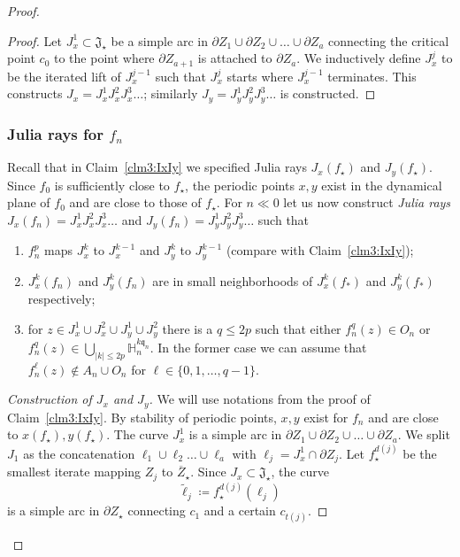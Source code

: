 \documentclass[]{amsart}
\newcommand\Jul{{\mathfrak J}}
\newcommand{\fH}{{\mathbb H}}
\newcommand{\str}{{\star}}
\renewcommand{\qq}{\mathfrak{q}}
\theoremstyle{remark}
\numberwithin{equation}{section}
\theoremstyle{definition}
\begin{document}
\begin{proof}
\begin{proof}
Let $J_{x}^{1}\subset \Jul_\str$ be a simple arc in $\partial Z_1 \cup \partial Z_2 \cup \dots \cup \partial Z_{a}$ connecting the critical point $c_0$ to the point where $\partial Z_{a+1}$ is attached to $\partial Z_{a}$. We inductively define $J_{x}^{j}$ to be the iterated lift of $J_{x}^{j-1}$ such that $J_{x}^{j}$ starts where $J_{x}^{j-1}$ terminates. This constructs $J_x=J_{x}^{1}J_{x}^{2}J_{x}^{3}\dots$; similarly $J_y=J_{y}^{1}J_{y}^{2}J_{y}^{3}\dots $ is constructed.\end{proof}



\subsubsection{Julia rays for $f_n$}
\label{ss:AlmInnRays}
Recall that in Claim~\ref{clm3:IxIy} we specified Julia rays $J_x(f_\str)$ and $J_y(f_\str)$. Since $f_0$ is sufficiently close to $f_\str$, the periodic points $x,y$ exist in the dynamical plane of $f_0$ and are close to those of $f_\str$. For $n\ll0$ let us now construct \emph{Julia rays} $J_x(f_n)=J_{x}^{1}J_{x}^{2}J_{x}^{3}\dots $ and  $J_y(f_n)=J_{y}^{1}J_{y}^{2}J_{y}^{3}\dots $ such that
\begin{enumerate}
\item $f^p_n$ maps $J_{x}^{k}$ to $J_{x}^{k-1}$ and  $J_{y}^{k}$ to $J_{y}^{k-1}$ (compare with Claim~\ref{clm3:IxIy});
\item $J_{x}^{k}(f_n)$ and  $J_{y}^{k}(f_n)$ are in small neighborhoods of $J_{x}^{k}(f_*)$ and  $J_{y}^{k}(f_*)$ respectively;
\item for $z\in J_{x}^{1}\cup J_{x}^{2}\cup J_{y}^{1}\cup  J_{y}^{2}$ there is a $q\le 2p$ such that either $f_n^{q}(z)\in O_n$ or $\displaystyle f_n^{q}(z)\in  \bigcup_{|k|\le 2p}\fH_{n}^{ k\qq_n} $. In the former case we can assume that $f_n^\ell(z)\not\in A_n\cup O_n$ for $\ell\in \{0,1,\dots, q-1\}$.\label{pr:3:ss:AlmInnRays}
\end{enumerate}

\begin{proof}[Construction of $J_{x}$ and $J_y$]
We will use notations from the proof of Claim~\ref{clm3:IxIy}. By stability of periodic points, $x,y$ exist for $f_n$ and are close to $x(f_\str), y(f_\str)$. The curve $J_{x}^{1}$ is a simple arc in $\partial Z_1 \cup \partial Z_2 \cup \dots \cup \partial Z_{a}$. We split $J_1$ as the concatenation $\ell_1\cup \ell_2 \dots\cup \ell_{a}$ with $\ell_j=J_{x}^{1}\cap \partial Z_j$. Let $f_\str^{d(j)}$ be the smallest iterate mapping $ Z_j$ to $\overline Z_\str$. Since $J_x\subset \Jul_\str$, the curve \[\widetilde \ell_j \coloneqq f_\str^{d(j)}(\ell_j)\] is a simple arc in $\partial Z_\str$ connecting $c_1$ and a certain $c_{t(j)}$.




\end{proof}
\end{proof}
\end{document}
